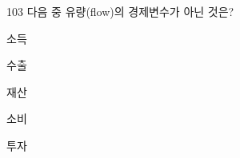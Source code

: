 \begin{question}{103}
다음 중 유량(flow)의 경제변수가 아닌 것은?
\begin{choices}
  \item 소득
  \item 수출
  \item 재산
  \item 소비
  \item 투자
\end{choices}
\end{question}
